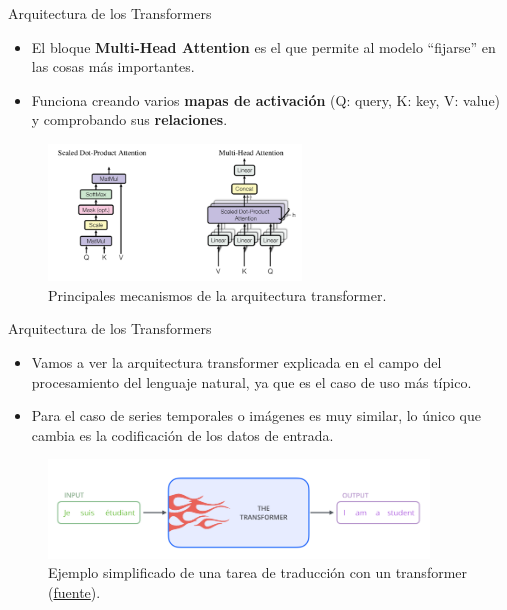 \begin{frame}{Arquitectura de los Transformers}
\begin{itemize}
    \item El bloque \textbf{Multi-Head Attention} es el que permite al modelo ``fijarse'' en las cosas más importantes.
    \item Funciona creando varios \textbf{mapas de activación} (Q: query, K: key, V: value) y comprobando sus \textbf{relaciones}.
\end{itemize}

\begin{figure}
    \centering
    \includegraphics[width=0.6\textwidth]{Slides/figures/02_Metodos_Generativos/trans-arch2.png}
    \caption{Principales mecanismos de la arquitectura transformer.}
\end{figure}

\end{frame}



\begin{frame}{Arquitectura de los Transformers}
\begin{itemize}
    \item Vamos a ver la arquitectura transformer explicada en el campo del procesamiento del lenguaje natural, ya que es el caso de uso más típico.
    \item Para el caso de series temporales o imágenes es muy similar, lo único que cambia es la codificación de los datos de entrada.
\end{itemize}

\begin{figure}
    \centering
    \includegraphics[width=0.9\textwidth]{Slides/figures/02_Metodos_Generativos/trans-arch3.png}
    \caption{Ejemplo simplificado de una tarea de traducción con un transformer (\href{http://jalammar.github.io/illustrated-transformer/}{fuente}).}
\end{figure}
\end{frame}

